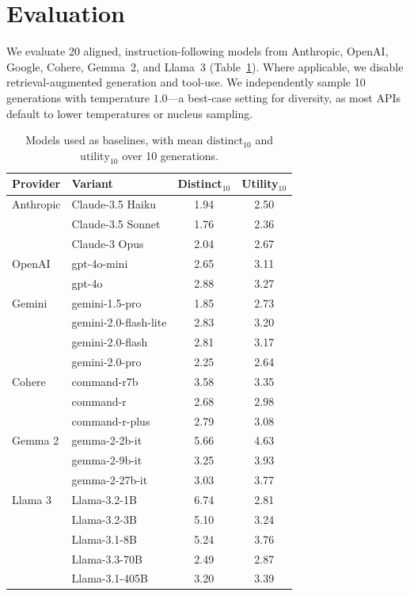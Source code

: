 
\section{Evaluation}
\label{sec-evaluation}
We evaluate 20 aligned, instruction-following models from Anthropic, OpenAI, Google, Cohere, Gemma~2, and Llama~3 (Table~\ref{tab:models}).
Where applicable, we disable retrieval-augmented generation and tool-use.
We independently sample 10 generations with temperature $1.0$---a best-case setting for diversity, as most APIs default to lower temperatures or nucleus sampling.


\begin{table}[t]
\centering
\small
\caption{Models used as baselines, with mean $\mathrm{distinct}_{10}$ and $\mathrm{utility}_{10}$ over 10 generations.}
\label{tab:models}
\begin{tabular}{llcc}
\toprule
Provider & Variant & Distinct$_{10}$ & Utility$_{10}$ \\
\midrule
Anthropic & Claude-3.5 Haiku & 1.94 & 2.50 \\
 & Claude-3.5 Sonnet & 1.76 & 2.36 \\
 & Claude-3 Opus & 2.04 & 2.67 \\
OpenAI & gpt-4o-mini & 2.65 & 3.11 \\
 & gpt-4o & 2.88 & 3.27 \\
Gemini & gemini-1.5-pro & 1.85 & 2.73 \\
 & gemini-2.0-flash-lite & 2.83 & 3.20 \\
 & gemini-2.0-flash & 2.81 & 3.17 \\
 & gemini-2.0-pro & 2.25 & 2.64 \\
Cohere & command-r7b & 3.58 & 3.35 \\
 & command-r & 2.68 & 2.98 \\
 & command-r-plus & 2.79 & 3.08 \\
Gemma 2 & gemma-2-2b-it & 5.66 & 4.63 \\
 & gemma-2-9b-it & 3.25 & 3.93 \\
 & gemma-2-27b-it & 3.03 & 3.77 \\
Llama 3 & Llama-3.2-1B & 6.74 & 2.81 \\
 & Llama-3.2-3B & 5.10 & 3.24 \\
 & Llama-3.1-8B & 5.24 & 3.76 \\
 & Llama-3.3-70B & 2.49 & 2.87 \\
 & Llama-3.1-405B & 3.20 & 3.39 \\
\bottomrule
\end{tabular}
\end{table}

